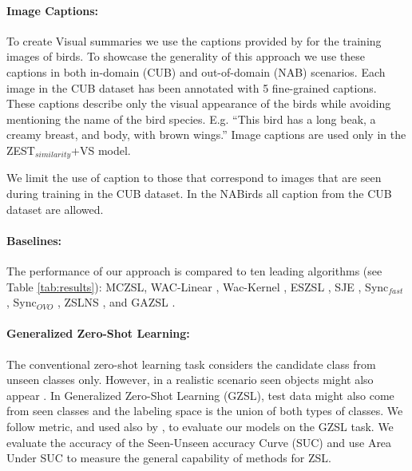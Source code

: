 \documentclass[11pt,a4paper]{article}
\begin{document}
\paragraph{Image Captions:}
To create Visual summaries we use the captions provided by \citet{reed2016learning} for the training images of birds. To showcase the generality of this approach we use these captions in both in-domain (CUB) and out-of-domain (NAB) scenarios.
Each image in the CUB dataset has been annotated with 5 fine-grained captions. These captions describe only the visual appearance of the birds while avoiding mentioning the name of the bird species. E.g. \enquote{This bird has a long beak, a creamy breast, and body, with brown wings.} Image captions 
are used only in the ZEST$_{similarity}$+VS model.
\par

We limit the use of caption to those that correspond to  images that are seen during training in the CUB dataset. In the NABirds all caption from the CUB dataset are allowed.


\paragraph{Baselines:}  The performance of
our approach is compared to ten leading algorithms (see Table \ref{tab:results}): MCZSL\citep{akata2016multi}, WAC-Linear \citep{elhoseiny2013write}, Wac-Kernel \citep{elhoseiny2016write}, ESZSL \citep{romera2015embarrassingly}, SJE \citep{akata2015evaluation}, Sync$_{fast}$ \citep{changpinyo2016synthesized}, Sync$_{OVO}$ \citep{changpinyo2016synthesized},
ZSLNS \citep{qiao2016less}, and GAZSL \citep{zhu2018generative}. 




\paragraph{Generalized Zero-Shot Learning:} 
The conventional zero-shot learning task considers the candidate class from unseen classes only. However, in a realistic scenario seen objects might also appear \cite{chao2016empirical}. In Generalized Zero-Shot Learning (GZSL), test data might also come from seen classes and the labeling space is the union of both types of classes. We follow \citet{chao2016empirical} metric, and used also by \citet{zhu2018generative}, to evaluate our models on the GZSL task. We evaluate the accuracy of the Seen-Unseen accuracy Curve (SUC) and use Area Under SUC to measure the general capability of methods for ZSL.
\end{document}
